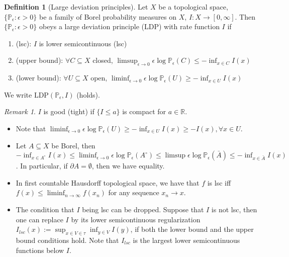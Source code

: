 \documentclass[openany,oneside]{article}
\theoremstyle{definition}
\newtheorem{defn}[thm]{Definition}
\theoremstyle{remark}
\newtheorem{rem}[thm]{Remark}
\renewcommand{\P}{\mathbb{P}} %
\begin{document}
\begin{defn}[Large deviation principles]
Let $X$ be a topological space, $\{\P_\epsilon : \epsilon >0\}$ be a family of Borel probability measures on $X$, $I:X\to [0,\infty]$. Then $\{\P_\epsilon : \epsilon >0\}$ obeys a large deviation principle (LDP) with rate function $I$ if
\begin{enumerate}
\item (lsc): $I$ is lower semicontinuous (lsc)
\item (upper bound): $\forall C\subseteq X$ closed, $\limsup_{\epsilon\to 0} \epsilon \log \P_\epsilon(C) \le -\inf_{x\in C}I(x) $
\item (lower bound): $\forall U\subseteq X$ open, $\liminf_{\epsilon\to 0} \epsilon \log \P_\epsilon(U) \ge -\inf_{x\in U}I(x) $
\end{enumerate}
We write LDP$(\P_{\epsilon}, I)$ (holds).
\end{defn}
\begin{rem}
$I$ is good (tight) if $\{I \le a\}$ is compact for $a\in \mathbb{R}$.
\begin{itemize}
\item Note that $\liminf_{\epsilon\to 0} \epsilon \log \P_\epsilon(U) \ge -\inf_{x\in U}I(x) \ge -I(x), \forall x\in U$.
\item Let $A \subseteq X$ be Borel, then $-\inf_{x\in A^\circ} I(x) \le \liminf_{\epsilon\to 0} \epsilon \log\P_\epsilon(A^\circ) \le \limsup \epsilon \log\P_\epsilon(\bar{A}) \le -\inf_{x\in\bar{A}} I(x)$. In particular, if $\partial A =\emptyset$, then we have equality.
\item In first countable Hausdorff topological space, we have that $f$ is lsc iff $f(x) \le \liminf_{n\to \infty}f(x_n)$ for any sequence $x_n \to x$.
\item The condition that $I$ being lsc can be dropped. Suppose that $I$ is not lsc, then one can replace $I$ by its lower semicontinuous regularization $I_{lsc}(x) := \sup_{x\in V \in \tau} \inf_{y\in V} I(y)$, if both the lower bound and the upper bound conditions hold. Note that $I_{lsc}$ is the largest lower semicontinuous functions below $I$.
\end{itemize}
\end{rem}
\end{document}

